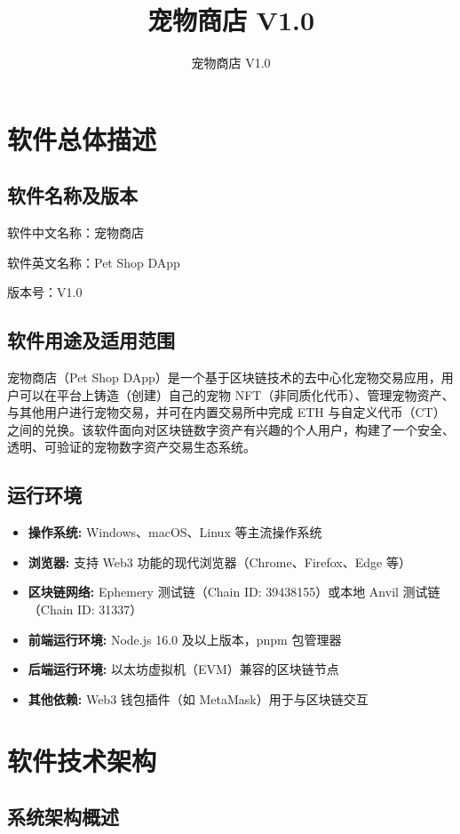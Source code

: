 \documentclass{mancls}
\title{宠物商店 V1.0}
\author{宠物商店 V1.0}
\begin{document}
\section{软件总体描述}

\subsection{软件名称及版本}

软件中文名称：宠物商店

软件英文名称：Pet Shop DApp

版本号：V1.0

\subsection{软件用途及适用范围}

宠物商店（Pet Shop DApp）是一个基于区块链技术的去中心化宠物交易应用，用户可以在平台上铸造（创建）自己的宠物 NFT（非同质化代币）、管理宠物资产、与其他用户进行宠物交易，并可在内置交易所中完成 ETH 与自定义代币（CT）之间的兑换。该软件面向对区块链数字资产有兴趣的个人用户，构建了一个安全、透明、可验证的宠物数字资产交易生态系统。

\subsection{运行环境}

\begin{itemize}
	\item \textbf{操作系统:} Windows、macOS、Linux 等主流操作系统
	\item \textbf{浏览器:} 支持 Web3 功能的现代浏览器（Chrome、Firefox、Edge 等）
	\item \textbf{区块链网络:} Ephemery 测试链（Chain ID: 39438155）或本地 Anvil 测试链（Chain ID: 31337）
	\item \textbf{前端运行环境:} Node.js 16.0 及以上版本，pnpm 包管理器
	\item \textbf{后端运行环境:} 以太坊虚拟机（EVM）兼容的区块链节点
	\item \textbf{其他依赖:} Web3 钱包插件（如 MetaMask）用于与区块链交互
\end{itemize}

\section{软件技术架构}

\subsection{系统架构概述}
\end{document}
